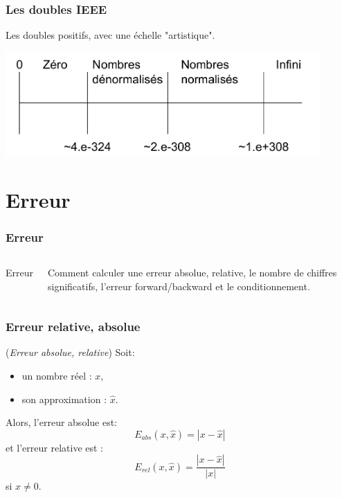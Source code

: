 \documentclass{beamer}
\begin{document}

\begin{frame}[containsverbatim]
\frametitle{Les doubles IEEE}

Les doubles positifs, avec une échelle "artistique".

\begin{center}
\includegraphics[width=0.9\textwidth]{subnormal-numbers.pdf}
\end{center}

\end{frame}

\section{Erreur}

\begin{frame}
\frametitle{Erreur}
  \begin{columns}
    
    {\huge{Erreur}}
	
	Comment calculer une erreur absolue, relative, le 
	nombre de chiffres significatifs, l'erreur forward/backward 
	et le conditionnement.
  \end{columns}
\end{frame}


\begin{frame}
\frametitle{Erreur relative, absolue}


\begin{definition}
(\emph{Erreur absolue, relative})
Soit:
\begin{itemize}
\item un nombre réel : $x$,
\item son approximation : $\hat{x}$.
\end{itemize}
Alors, l'erreur absolue est:
$$
E_{abs}(x,\hat{x}) = |x-\hat{x}|
$$
et l'erreur relative est :
$$
E_{rel}(x,\hat{x}) = \frac{|x-\hat{x}|}{|x|}
$$
si $x\neq 0$.
\end{definition}

\end{frame}
\end{document}
